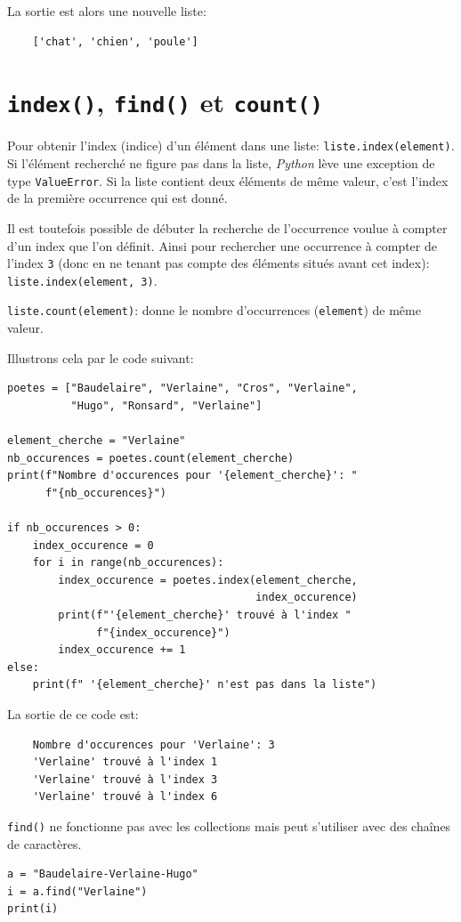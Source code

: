 \documentclass[a4paper,12pt]{book}
\begin{document}
La sortie est alors une nouvelle liste:
\begin{verbatim}
    ['chat', 'chien', 'poule']
\end{verbatim}
\medskip

\section{\texttt{index()}, \texttt{find()} et \texttt{count()}}
Pour obtenir l'index (indice) d'un élément dans une liste: \texttt{liste.index(element)}. Si l'élément recherché ne figure pas dans la liste, \textit{Python} lève une exception de type \texttt{ValueError}. Si la liste contient deux éléments de même valeur, c'est l'index de la première occurrence qui est donné.
\medskip

Il est toutefois possible de débuter la recherche de l'occurrence voulue à compter d'un index que l'on définit. Ainsi pour rechercher une occurrence à compter de l'index \texttt{3} (donc en ne tenant pas compte des éléments situés avant cet index): \texttt{liste.index(element, 3)}.
\medskip

\texttt{liste.count(element)}: donne le nombre d'occurrences (\texttt{element}) de même valeur.
\medskip

Illustrons cela par le code suivant:
\begin{lstlisting}
poetes = ["Baudelaire", "Verlaine", "Cros", "Verlaine",
          "Hugo", "Ronsard", "Verlaine"]

element_cherche = "Verlaine"
nb_occurences = poetes.count(element_cherche)
print(f"Nombre d'occurences pour '{element_cherche}': "
      f"{nb_occurences}")
      
if nb_occurences > 0:
    index_occurence = 0
    for i in range(nb_occurences):
        index_occurence = poetes.index(element_cherche, 
                                       index_occurence)
        print(f"'{element_cherche}' trouvé à l'index "
              f"{index_occurence}")
        index_occurence += 1
else:
    print(f" '{element_cherche}' n'est pas dans la liste")
\end{lstlisting}
\medskip

La sortie de ce code est:
\begin{verbatim}
    Nombre d'occurences pour 'Verlaine': 3
    'Verlaine' trouvé à l'index 1
    'Verlaine' trouvé à l'index 3
    'Verlaine' trouvé à l'index 6
\end{verbatim}
\medskip

\texttt{find()} ne fonctionne pas avec les collections mais peut s'utiliser avec des chaînes de caractères.
\begin{lstlisting}
a = "Baudelaire-Verlaine-Hugo"
i = a.find("Verlaine")
print(i)
\end{lstlisting}
\medskip
\end{document}
